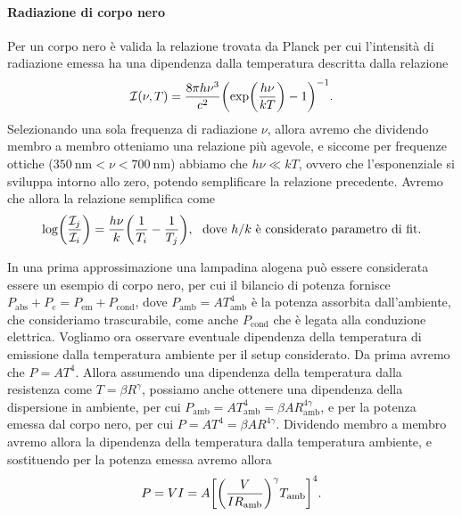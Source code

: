 \documentclass[a4paper, varvw, nofootinbib]{revtex4-2}
\begin{document}
\paragraph*{Radiazione di corpo nero} Per un corpo nero è valida la relazione trovata da Planck per cui l'intensità di radiazione emessa ha una dipendenza dalla temperatura descritta dalla relazione \begin{equation} \mathcal I(\nu, T) = \frac{8 \pi h \nu^3}{c^2}\qty(\exp(\frac{h\nu}{kT})-1)^{-1}.  \end{equation} Selezionando una sola frequenza di radiazione $\nu$, allora avremo che dividendo membro a membro otteniamo una relazione più agevole, e siccome per frequenze ottiche ($\SI{350}{\nano\metre} < \nu <\SI{700}{\nano\metre}$) abbiamo che $h\nu \ll kT$, ovvero che l'esponenziale si sviluppa intorno allo zero, potendo semplificare la relazione precedente. Avremo che allora la relazione semplifica come \begin{equation} \log(\frac{\mathcal I_j}{\mathcal I_i}) = \frac{h\nu}{k}\qty({1\over T_i} - {1\over T_j}),~\text{ dove $h/k$ è considerato parametro di fit.} \label{eq:3}\end{equation}

In una prima approssimazione una lampadina alogena può essere considerata essere un esempio di corpo nero, per cui il bilancio di potenza fornisce $P_\text{abs} + P_e = P_\text{em} + P_\text{cond}$, dove $P_\text{amb} = AT_\text{amb}^4$ è la potenza assorbita dall'ambiente, che consideriamo trascurabile, come anche $P_\text{cond}$ che è legata alla conduzione elettrica. 
Vogliamo ora osservare eventuale dipendenza della temperatura di emissione dalla temperatura ambiente per il setup considerato. Da prima avremo che $P = AT^4$.  Allora assumendo una dipendenza della temperatura dalla resistenza come $T = \beta R^\gamma$, possiamo anche ottenere una dipendenza della dispersione in ambiente, per cui $P_\text{amb} = AT_\text{amb}^4 = \beta A R^{4\gamma}_\text{amb}$, e per la potenza emessa dal corpo nero, per cui $P = AT^4 = \beta A R^{4\gamma}$. Dividendo membro a membro avremo allora la dipendenza della temperatura dalla temperatura ambiente, e sostituendo per la potenza emessa avremo allora \begin{equation} P = VI =  A \qty[\qty(\frac{V}{IR_\text{amb}})^\gamma T_\text{amb}]^4.\label{eq:4} \end{equation} 
\end{document}
